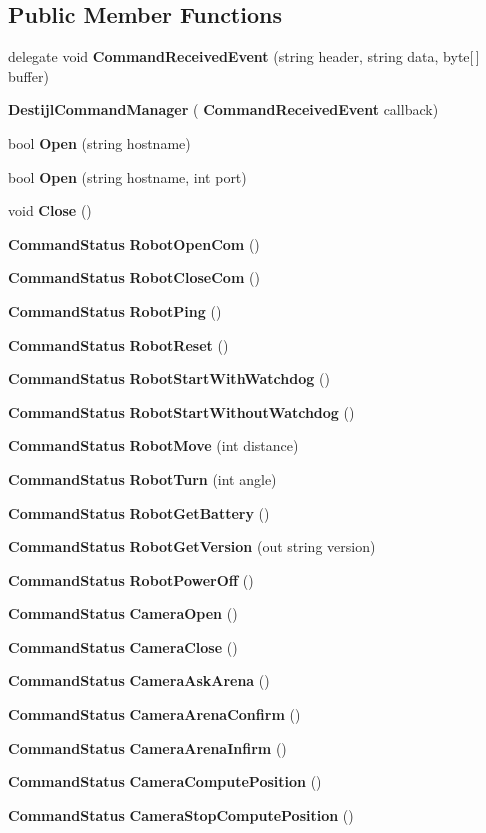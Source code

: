 \subsection*{Public Member Functions}
\begin{DoxyCompactItemize}
\item 
delegate void \textbf{ Command\+Received\+Event} (string header, string data, byte[$\,$] buffer)
\item 
\textbf{ Destijl\+Command\+Manager} (\textbf{ Command\+Received\+Event} callback)
\item 
bool \textbf{ Open} (string hostname)
\item 
bool \textbf{ Open} (string hostname, int port)
\item 
void \textbf{ Close} ()
\item 
\textbf{ Command\+Status} \textbf{ Robot\+Open\+Com} ()
\item 
\textbf{ Command\+Status} \textbf{ Robot\+Close\+Com} ()
\item 
\textbf{ Command\+Status} \textbf{ Robot\+Ping} ()
\item 
\textbf{ Command\+Status} \textbf{ Robot\+Reset} ()
\item 
\textbf{ Command\+Status} \textbf{ Robot\+Start\+With\+Watchdog} ()
\item 
\textbf{ Command\+Status} \textbf{ Robot\+Start\+Without\+Watchdog} ()
\item 
\textbf{ Command\+Status} \textbf{ Robot\+Move} (int distance)
\item 
\textbf{ Command\+Status} \textbf{ Robot\+Turn} (int angle)
\item 
\textbf{ Command\+Status} \textbf{ Robot\+Get\+Battery} ()
\item 
\textbf{ Command\+Status} \textbf{ Robot\+Get\+Version} (out string version)
\item 
\textbf{ Command\+Status} \textbf{ Robot\+Power\+Off} ()
\item 
\textbf{ Command\+Status} \textbf{ Camera\+Open} ()
\item 
\textbf{ Command\+Status} \textbf{ Camera\+Close} ()
\item 
\textbf{ Command\+Status} \textbf{ Camera\+Ask\+Arena} ()
\item 
\textbf{ Command\+Status} \textbf{ Camera\+Arena\+Confirm} ()
\item 
\textbf{ Command\+Status} \textbf{ Camera\+Arena\+Infirm} ()
\item 
\textbf{ Command\+Status} \textbf{ Camera\+Compute\+Position} ()
\item 
\textbf{ Command\+Status} \textbf{ Camera\+Stop\+Compute\+Position} ()
\end{DoxyCompactItemize}

